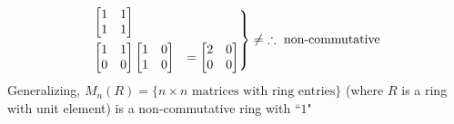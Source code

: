 \begin{enumerate}
\begin{equation*}
\begin{drcases}
\begin{bmatrix}
                    1&1\\1&1
            \end{bmatrix} \\
            \begin{bmatrix}
                    1&1\\0&0
            \end{bmatrix}\begin{bmatrix}
                    1&0\\1&0
            \end{bmatrix} &= \begin{bmatrix}
                    2&0\\0&0
            \end{bmatrix} 
        \end{drcases} \neq \ \therefore \text{ non-commutative}
    \end{equation*}
    Generalizing, $M_n(R)=\{n\times n \text{ matrices with ring entries}\}$ (where $R$ is a ring with unit element) is a non-commutative ring with ``$1$"
\end{enumerate}

